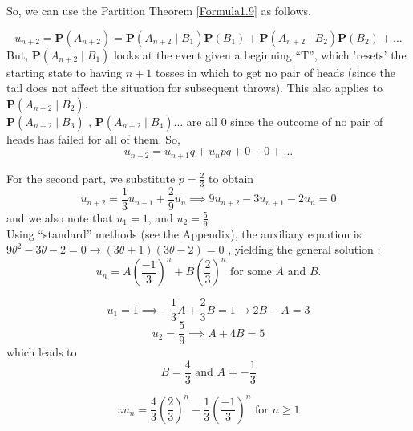 \documentclass[a4paper,10pt]{article}
\begin{document}
\begin{flushleft}
So, we can use the Partition Theorem \eqref{Formula1.9} as follows.

\begin{equation*} 
u_{n+2} = \mathbf{P}(A_{n+2}) = \mathbf{P}(A_{n+2} \mid B_1)\mathbf{P}(B_1) + \mathbf{P}(A_{n+2} \mid B_2)\mathbf{P}(B_2) + \ldots 
\end{equation*}
But, $\mathbf{P}(A_{n+2} \mid B_1)$ looks at the event given a beginning ``T'', which 'resets' the starting state to having $n+1$ tosses 
in which to get no pair of heads (since the tail does not affect the situation for subsequent throws). This also applies to $\mathbf{P}(A_{n+2} \mid B_2)$. \\
$\mathbf{P}(A_{n+2} \mid B_3)$ , $\mathbf{P}(A_{n+2} \mid B_4)\ldots$ are all $0$ since the outcome of no pair of heads has failed for all of them. So,  
\begin{equation*} 
u_{n+2} = u_{n+1} q + u_n pq + 0 + 0 + \ldots 
\end{equation*}


For the second part, we substitute $p = \frac{2}{3}$ to obtain
\begin{equation*} 
u_{n+2} = \frac{1}{3} u_{n+1} + \frac{2}{9} u_n  \implies 9u_{n+2} - 3u_{n+1} - 2u_n = 0
\end{equation*}
and we also note that $u_1 = 1$, and $u_2 = \frac{5}{9}$ \\

Using ``standard'' methods (see the Appendix), the auxiliary equation is $9\theta^2 - 3\theta - 2 = 0 \rightarrow (3\theta+1)(3\theta-2) = 0$ , yielding the general solution : 
\begin{equation*} 
u_n = A\left(\frac{-1}{3}\right)^n + B\left(\frac{2}{3}\right)^n \text{ for some } A \text{ and } B.
\end{equation*} 

\begin{equation*} 
u_1 = 1 \implies -\frac{1}{3}A + \frac{2}{3}B = 1 \rightarrow 2B - A = 3
\end{equation*} 
\begin{equation*} 
u_2 = \frac{5}{9} \implies A + 4B = 5
\end{equation*} 
which leads to 
\begin{equation*} 
B = \frac{4}{3} \text{ and } A = -\frac{1}{3}
\end{equation*} 

\begin{equation} 
\therefore u_n = \frac{4}{3} \left(\frac{2}{3}\right)^n - \frac{1}{3} \left(\frac{-1}{3}\right)^n   \text{ for } n \geq 1
\label{Ex27_Result}
\end{equation} 


\end{flushleft}
\end{document}
